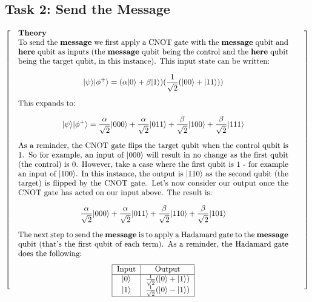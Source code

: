 \documentclass[a4paper]{article}
\begin{document}
\subsection{Task 2: Send the Message}
\[
  \left[
      \begin{tabular}{@{\quad}m{\textwidth}@{\qquad}m{\textwidth}@{\quad}}
          \textbf{Theory} \par
To send the \textbf{message} we first apply a CNOT gate with the \textbf{message} qubit and \textbf{here} qubit as inputs (the \textbf{message} qubit being the control and the \textbf{here} qubit being the target qubit, in this instance). This input state can be written:
$$ |\psi\rangle|\phi^+\rangle = (\alpha|0\rangle + \beta|1\rangle)(\frac{1}{\sqrt{2}}(|00\rangle + |11\rangle)) $$
This expands to:
$$ |\psi\rangle|\phi^+\rangle = \frac{\alpha}{\sqrt{2}}|000\rangle + \frac{\alpha}{\sqrt{2}}|011\rangle + \frac{\beta}{\sqrt{2}}|100\rangle + \frac{\beta}{\sqrt{2}}|111\rangle $$
As a reminder, the CNOT gate flips the target qubit when the control qubit is 1. So for example, an input of $|000\rangle$ will result in no change as the first qubit (the control) is 0. However, take a case where the first qubit is 1 - for example an input of $|100\rangle$. In this instance, the output is $|110\rangle$ as the second qubit (the target) is flipped by the CNOT gate.
Let's now consider our output once the CNOT gate has acted on our input above. The result is:
$$ \frac{\alpha}{\sqrt{2}}|000\rangle + \frac{\alpha}{\sqrt{2}}|011\rangle + \frac{\beta}{\sqrt{2}}|110\rangle + \frac{\beta}{\sqrt{2}}|101\rangle $$
The next step to send the \textbf{message} is to apply a Hadamard gate to the \textbf{message} qubit (that's the first qubit of each term).
As a reminder, the Hadamard gate does the following:
\begin{center}
\begin{tabular}{ |c|c| } 
 \hline
 Input & Output \\ 
 \hline
 $\vert0\rangle$ & $\frac{1}{\sqrt{2}}(\vert0\rangle + \vert1\rangle)$ \\ 
 $\vert1\rangle$ & $\frac{1}{\sqrt{2}}(\vert0\rangle - \vert1\rangle)$ \\ 
 \hline
\end{tabular}
\end{center}
\\
%
      \end{tabular}
    \right]
\]\\
\end{document}
